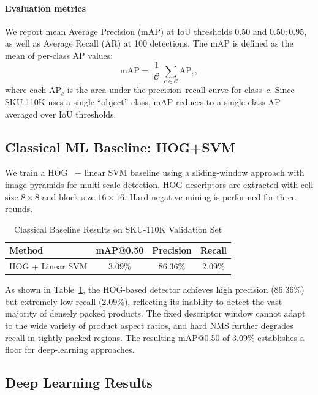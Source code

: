 \documentclass[conference]{IEEEtran}
\begin{document}
\paragraph{Evaluation metrics}
We report mean Average Precision (mAP) at IoU thresholds $0.50$ and
$0.50{:}0.95$, as well as Average Recall (AR) at 100 detections. The mAP
is defined as the mean of per-class AP values:
\begin{equation}
  \text{mAP} = \frac{1}{|\mathcal{C}|} \sum_{c \in \mathcal{C}}
               \text{AP}_c,
  \label{eq:map}
\end{equation}
where each $\text{AP}_c$ is the area under the precision--recall curve for
class~$c$. Since SKU-110K uses a single ``object'' class, mAP reduces to
a single-class AP averaged over IoU thresholds.

\subsection{Classical ML Baseline: HOG+SVM}
\label{sec:hog}

We train a HOG~\cite{dalal2005hog} + linear SVM baseline using a
sliding-window approach with image pyramids for multi-scale detection.
HOG descriptors are extracted with cell size $8\times 8$ and block size
$16\times 16$. Hard-negative mining is performed for three rounds.

\begin{table}[t]
  \centering
  \caption{Classical Baseline Results on SKU-110K Validation Set}
  \label{tab:hog}
  \begin{tabular}{@{}lccc@{}}
    \toprule
    Method & mAP@0.50 & Precision & Recall \\
    \midrule
    HOG + Linear SVM & 3.09\% & 86.36\% & 2.09\% \\
    \bottomrule
  \end{tabular}
\end{table}

As shown in Table~\ref{tab:hog}, the HOG-based detector achieves high
precision (86.36\%) but extremely low recall (2.09\%), reflecting its
inability to detect the vast majority of densely packed products. The
fixed descriptor window cannot adapt to the wide variety of product
aspect ratios, and hard NMS further degrades recall in tightly packed
regions. The resulting mAP@0.50 of 3.09\% establishes a floor for
deep-learning approaches.

\subsection{Deep Learning Results}
\label{sec:dl_results}
\end{document}
